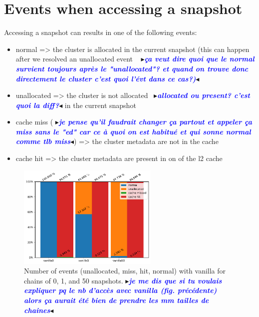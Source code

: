 \documentclass[sigplan,screen,10pt]{acmart}
\newcommand{\mynote}[2]{\fbox{\bfseries\sffamily\footnotesize{\textbf{#1}}}
 {\small$\blacktriangleright$\textsf{\emph{#2}}$\blacktriangleleft$}}
\newcommand{\mynote}[2]{}
\newcommand{\stella}[1]{\mynote{\textcolor{red}{Stella}}{\textcolor{blue}{\textbf{#1}}}}
\begin{document}
	\section*{Events when accessing a snapshot}%
	Accessing a snapshot can results in one of the following events:
	\begin{itemize}
		\item normal => the cluster is allocated in the current snapshot (this can happen after we resolved an unallocated event ~\stella{ça veut dire quoi que le normal survient toujours après le "unallocated"? et quand on trouve donc directement le cluster c'est quoi l'évt dans ce cas?)}
		\item unallocated => the cluster is not allocated~\stella{allocated ou present? c'est quoi la diff?} in the current snapshot
		\item cache miss (\stella{je pense qu'il faudrait changer ça partout et appeler ça miss sans le "ed" car ce à quoi on est habitué et qui sonne normal comme tlb miss}) => the cluster metadata are not in the cache
		\item cache hit => the cluster metadata are present in on of the l2 cache
	\end{itemize}
		
	\begin{figure}[h]
		\center
		\includegraphics[width=0.6\textwidth]{number_events_per_chain_va.pdf}
		\caption{Number of events (unallocated, miss, hit, normal) with vanilla for chains of 0, 1, and 50 snapshots.\stella{je me dis que si tu voulais expliquer pq le nb d'accès avec vanilla (fig. précédente) alors ça aurait été bien de prendre les mm tailles de chaines}}
		\label{fig:fig36}
	\end{figure}
\end{document}
